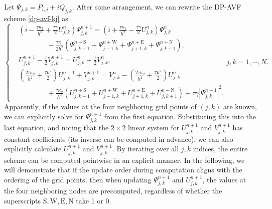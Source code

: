 \documentclass[fleqn,11pt]{elsarticle}
\numberwithin{equation}{section}
\begin{document}
Let $\Psi_{j,k}=P_{i,j}+iQ_{j,k}$. After some arrangement, we can rewrite the DP-AVF scheme \eqref{dp-avf-kj}  as
\begin{equation}\label{scheme1}
	\left\{\begin{aligned}
		 & (i-\frac{\tau\kappa_1}{h^2}+\frac{\tau\gamma}{2}U_{j,k}^n) \Psi_{j,k}^{n+1}=(i+\frac{\tau\kappa_1}{h^2}-\frac{\tau\gamma}{2} U_{j,k}^n)\Psi_{j,k}^{n}                     \\
		 & \qquad\qquad-\frac{\tau\kappa_1}{2h^2}(\Psi_{j,k-1}^{n+\text{S}}+\Psi_{j-1, k}^{n+\text{W}} + \Psi_{j+1, k}^{n+\text{E}} + \Psi_{j, k+1}^{n+\text{N}}),                   \\
		 & U_{j,k}^{n+1}-\frac{\tau}{2} V_{j,k}^{n+1}=U_{j,k}^n+\frac{\tau}{2} V_{j,k}^{n},                                                                                          \\
		 & (\frac{2\tau\kappa_2}{h^2}+\frac{\tau\mu^2}{2} )U_{j,k}^{n+1}+V_{j,k}^{n+1}=V_{j,k}^n-(\frac{2\tau\kappa_2}{h^2}+\frac{\tau\mu^2}{2}) U_{j,k}^{n}                         \\
		 & \qquad\qquad+\frac{\tau\kappa_2}{h^2}(U_{j,k-1}^{n+\text{S}}+U_{j-1, k}^{n+\text{W}}+ U_{j+1, k}^{n+\text{E}} + U_{j, k+1}^{n+\text{N}})+\tau\gamma |\Psi_{j,k}^{n+1}|^2.
	\end{aligned}\right.j, k = 1, \cdots, N.
\end{equation}
Apparently, if the values at the four neighboring grid points of $(j,k)$ are known, we can explicitly solve for $\Psi_{j,k}^{n+1}$ from the first equation. Substituting this into the last equation, and noting that the $2\times 2$ linear system for $U_{j,k}^{n+1}$ and $V_{j,k}^{n+1}$ has constant coefficients (its inverse can be computed in advance), we can also explicitly calculate $U_{j,k}^{n+1}$ and $V_{j,k}^{n+1}$. By iterating over all $j,k$ indices, the entire scheme can be computed pointwise in an explicit manner. In the following, we will demonstrate that if the update order during computation aligns with the ordering of the grid points, then when updating $\Psi_{j,k}^{n+1}$ and $U_{j,k}^{n+1}$, the values at the four neighboring nodes are precomputed, regardless of whether the superscripts $\text{S}, \text{W}, \text{E}, \text{N}$ take 1 or 0.
\end{document}
